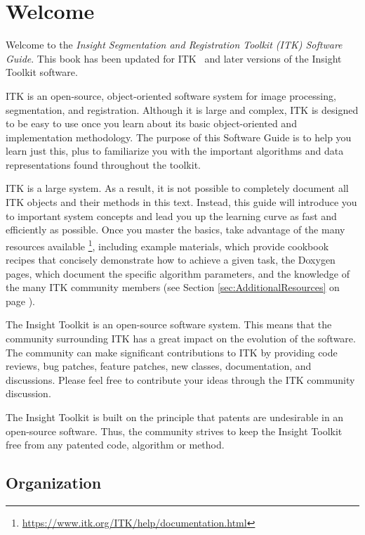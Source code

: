 \chapter{Welcome}
\label{chapter:Introduction}

Welcome to the
\emph{Insight Segmentation and Registration Toolkit (ITK) Software Guide}. This
book has been updated for ITK \ITKVERSIONMAJORMINORPATCH\ and later versions of
the Insight Toolkit software.

ITK is an open-source, object-oriented software system for image processing,
segmentation, and registration. Although it is large and complex, ITK is
designed to be easy to use once you learn about its basic object-oriented and
implementation methodology. The purpose of this Software Guide is
to help you learn just this, plus to familiarize you with the important
algorithms and data representations found throughout the toolkit.

ITK is a large system. As a result, it is not possible to completely document
all ITK objects and their methods in this text. Instead, this guide will
introduce you to important system concepts and lead you up the learning curve
as fast and efficiently as possible. Once you master the basics, take
advantage of the many resources available
\footnote{\url{https://www.itk.org/ITK/help/documentation.html}}, including example
materials, which provide cookbook recipes that concisely demonstrate how to
achieve a given task, the Doxygen pages, which document the specific algorithm
parameters, and the knowledge of the many ITK community members (see Section
\ref{sec:AdditionalResources} on page \pageref{sec:AdditionalResources}).

The Insight Toolkit is an open-source software system. This means that the
community surrounding ITK has a great impact on the evolution of the software.
The community can make significant contributions to ITK by providing code
reviews, bug patches, feature patches, new classes, documentation, and
discussions. Please feel free to contribute your ideas through the ITK
community discussion.

The Insight Toolkit is built on the principle that patents are undesirable in
an open-source software. Thus, the community strives to keep the Insight
Toolkit free from any patented code, algorithm or method.

\section{Organization}
\label{sec:Organization}

